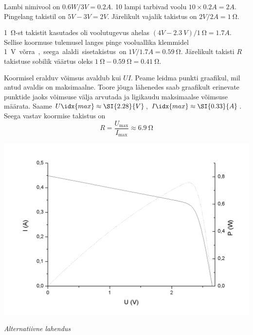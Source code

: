 \documentclass[10pt]{article}
\begin{document}
{%

\solu
\osa Lambi nimivool on $\SI{0,6}W/\SI{3}V=\SI{0,2}A$. 10
lampi tarbivad voolu $10\times \SI{0,2}A=\SI{2}A$. Pingelang takistil on $\SI{5}V-\SI{3}V=\SI{2}V$. Järelikult vajalik takistus on $\SI{2}V/\SI{2}A=\SI{1}{\ohm}$.

\osa \SI{1}{\ohm}-st takistit kasutades oli voolutugevus ahelas $(\SI{4}V-\SI{2,3}{V})/\SI{1}{\ohm}=\SI{1,7}A$. Sellise koormuse tulemusel langes pinge vooluallika
klemmidel \SI{1}V võrra, seega alaldi sisetakistus on $\SI{1}V/\SI{1,7}A=\SI{0,59}{\ohm}$. Järelikult takisti $R$ takistuse sobilik väärtus oleks
$\SI{1}{\ohm}-\SI{0,59}{\ohm}=\SI{0,41}{\ohm}$.
\probend
\bigskip


\solu
Koormisel eralduv võimsus avaldub kui $UI$. Peame leidma punkti graafikul, mil antud avaldis on maksimaalne. Toore jõuga lähenedes saab graafikult erinevate punktide jaoks võimsuse välja arvutada ja ligikaudu maksimaalse võimsuse määrata. Saame $U\idx{max} \approx \SI{2.28}{V}$, $I\idx{max}\approx \SI{0.33}{A}$. Seega vastav koormise takistus on
\[
R = \frac{U_\mathrm{max}}{I_\mathrm{max}} \approx \SI{6.9}{\ohm}
\]


\begin{center}
	\vspace{-0.1cm}
	\includegraphics[width=0.8\linewidth]{2010-v3g-03-paneel_lah.png}
\end{center}

\textit{Alternatiivne lahendus}\\

}
\end{document}
